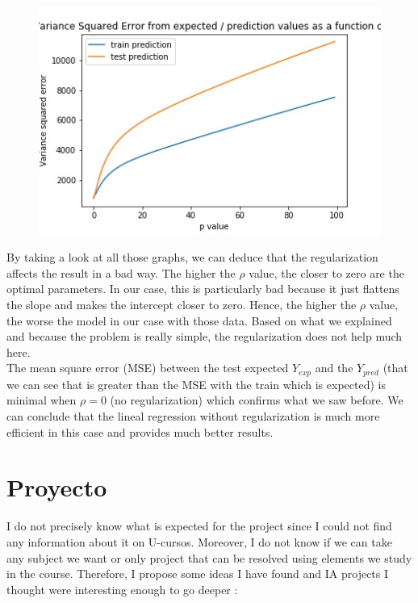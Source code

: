 \documentclass{article}
\begin{document}
\begin{figure}[h]
  \includegraphics[scale = 0.45]{img/graph_VSE.jpg}
\end{figure}

By taking a look at all those graphs, we can deduce that the regularization affects the result in a bad way. The higher the $\rho$ value, the closer to zero are the optimal parameters. In our case, this is particularly bad because it just flattens the slope and makes the intercept closer to zero. Hence, the higher the $\rho$ value, the worse the model in our case with those data. Based on what we explained and because the problem is really simple, the regularization does not help much here. \\

The mean square error (MSE) between the test expected $Y_{exp}$ and the $Y_{pred}$ (that we can see that is greater than the MSE with the train which is expected) is minimal when $\rho = 0$ (no regularization) which confirms what we saw before. We can conclude that the lineal regression without regularization is much more efficient in this case and provides much better results.

\section{Proyecto}

I do not precisely know what is expected for the project since I could not find any information about it on U-cursos. Moreover, I do not know if we can take any subject we want or only project that can be resolved using elements we study in the course. Therefore, I propose some ideas I have found and IA projects I thought were interesting enough to go deeper :
\end{document}
